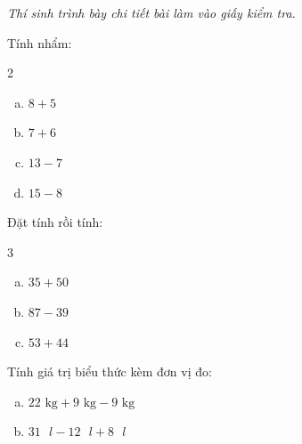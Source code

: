 {\itshape Thí sinh trình bày chi tiết bài làm vào giấy kiểm tra.}

\begin{bt}[1,0 điểm]
Tính nhẩm:
\begin{multicols}{2}
\begin{enumerate}[a)]
  \item $8 + 5$
  \item $7 + 6$
  \item $13 - 7$
  \item $15 - 8$
\end{enumerate}
\end{multicols}
\end{bt}

\begin{bt}[1,5 điểm]
Đặt tính rồi tính:
\begin{multicols}{3}
\begin{enumerate}[a)]
  \item $35 + 50$
  \item $87 - 39$
  \item $53 + 44$
\end{enumerate}
\end{multicols}
\end{bt}

\begin{bt}[1,0 điểm]
Tính giá trị biểu thức kèm đơn vị đo:
\begin{enumerate}[a)]
  \item $22\text{ kg} + 9\text{ kg} - 9\text{ kg}$
  \item $31\text{ }l - 12\text{ }l + 8\text{ }l$
\end{enumerate}
\end{bt}

